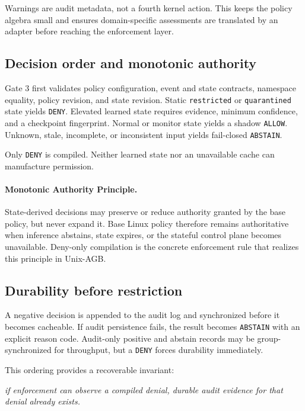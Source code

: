 \documentclass[11pt,a4paper]{article}
\begin{document}
Warnings are audit metadata, not a fourth kernel action. This keeps the policy
algebra small and ensures domain-specific assessments are translated by an
adapter before reaching the enforcement layer.

\subsection{Decision order and monotonic authority}

Gate 3 first validates policy configuration, event and state contracts,
namespace equality, policy revision, and state revision. Static
\texttt{restricted} or \texttt{quarantined} state yields \texttt{DENY}.
Elevated learned state requires evidence, minimum confidence, and a checkpoint
fingerprint. Normal or monitor state yields a shadow \texttt{ALLOW}. Unknown,
stale, incomplete, or inconsistent input yields fail-closed
\texttt{ABSTAIN}.

Only \texttt{DENY} is compiled. Neither learned state nor an unavailable cache
can manufacture permission.

\paragraph{Monotonic Authority Principle.}
State-derived decisions may preserve or reduce authority granted by the base
policy, but never expand it. Base Linux policy therefore remains authoritative
when inference abstains, state expires, or the stateful control plane becomes
unavailable. Deny-only compilation is the concrete enforcement rule that
realizes this principle in Unix-AGB.

\subsection{Durability before restriction}

A negative decision is appended to the audit log and synchronized before it
becomes cacheable. If audit persistence fails, the result becomes
\texttt{ABSTAIN} with an explicit reason code. Audit-only positive and abstain
records may be group-synchronized for throughput, but a \texttt{DENY} forces
durability immediately.

This ordering provides a recoverable invariant:

\begin{center}
\textit{if enforcement can observe a compiled denial, durable audit evidence
for that denial already exists.}
\end{center}
\end{document}
